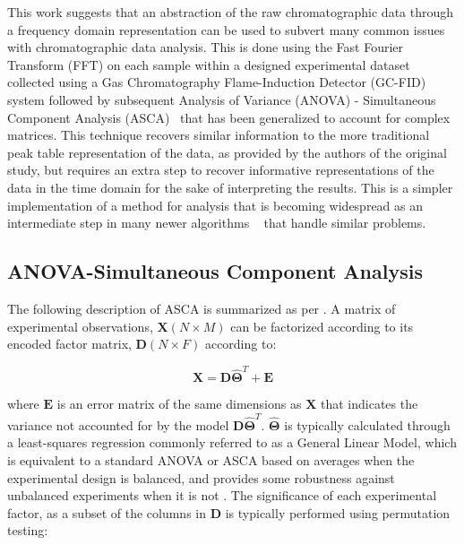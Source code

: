 \documentclass[preprint,12pt]{elsarticle}
\begin{document}
This work suggests that an abstraction of the raw chromatographic data through a frequency domain representation can be used to subvert many common issues with chromatographic data analysis. This is done using the Fast Fourier Transform (FFT) on each sample within a designed experimental dataset collected using a Gas Chromatography Flame-Induction Detector (GC-FID) system followed by subsequent Analysis of Variance (ANOVA) - Simultaneous Component Analysis (ASCA)~\cite{smilde2005anova} that has been generalized to account for complex matrices. This technique recovers similar information to the more traditional peak table representation of the data, as provided by the authors of the original study, but requires an extra step to recover informative representations of the data in the time domain for the sake of interpreting the results. This is a simpler implementation of a method for analysis that is becoming widespread as an intermediate step in many newer algorithms ~\cite{schneide2023shift,schneide2024shift,yu2023parasias} that handle similar problems.


\subsection{ANOVA-Simultaneous Component Analysis}\label{sec:glm}

The following description of ASCA is summarized as per \cite{camacho2023permutation}. A matrix of experimental observations, $\mathbf{X} (N \times M)$ can be factorized according to its encoded factor matrix, $\mathbf{D} (N \times F)$ according to:

\begin{equation}
    \mathbf{X} = \mathbf{D} \mathbf{\hat{\Theta}}^T + \mathbf{E}
\end{equation}

\noindent where $\mathbf{E}$ is an error matrix of the same dimensions as $\mathbf{X}$ that indicates the variance not accounted for by the model $\mathbf{D} \mathbf{\hat{\Theta}}^T$. $\mathbf{\hat{\Theta}}$ is typically calculated through a least-squares regression commonly referred to as a General Linear Model, which is equivalent to a standard ANOVA or ASCA based on averages when the experimental design is balanced, and provides some robustness against unbalanced experiments when it is not \cite{smilde2005anova}. The significance of each experimental factor, as a subset of the columns in $\mathbf{D}$ is typically performed using permutation testing:
\end{document}
